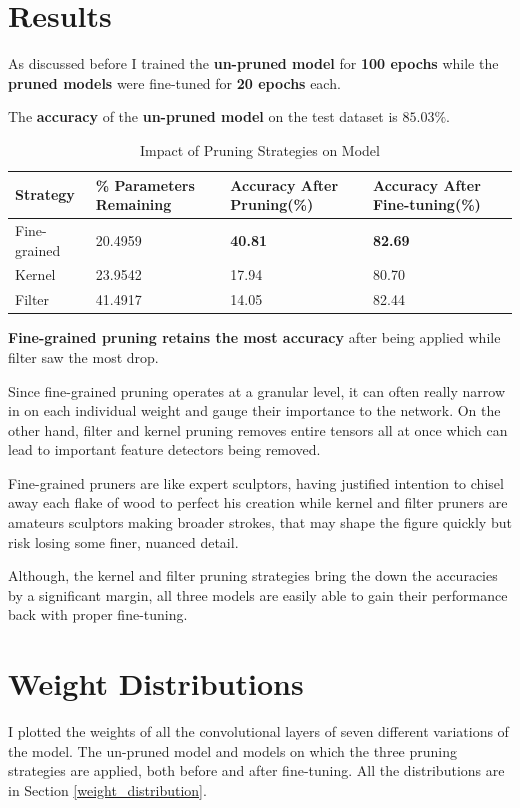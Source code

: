 \documentclass[12pt]{article}
\begin{document}
\section{Results}
As discussed before I trained the \textbf{un-pruned model} for \textbf{100 epochs} while the \textbf{pruned models} were fine-tuned for \textbf{20 epochs} each. 

The \textbf{accuracy} of the \textbf{un-pruned model} on the test dataset is $\boldsymbol{85.03\%}$. 

\begin{table}[h]
\centering
\label{tab:vgg16_pruning_impact}
\begin{tabular}{|p{3.25cm}||p{3.25cm}|p{3.25cm}|p{3.25cm}|}
\hline
\textbf{Strategy} & \textbf{\% Parameters  Remaining} & \textbf{Accuracy After Pruning(\%)} & \textbf{Accuracy After Fine-tuning(\%)} \\
\hline
Fine-grained & 20.4959 & \textbf{40.81} & \textbf{82.69} \\
Kernel & 23.9542 & 17.94 & 80.70 \\
Filter & 41.4917 & 14.05 & 82.44 \\
\hline
\end{tabular}
\caption{Impact of Pruning Strategies on Model}
\end{table}
\noindent
\textbf{Fine-grained pruning retains the most accuracy} after being applied while filter saw the most drop. 

Since fine-grained pruning operates at a granular level, it can often really narrow in on each individual weight and gauge their importance to the network. On the other hand, filter and kernel pruning removes entire tensors all at once which can lead to important feature detectors being removed. 

Fine-grained pruners are like expert sculptors, having justified intention to chisel away each flake of wood to perfect his creation while kernel and filter pruners are amateurs sculptors making broader strokes, that may shape the figure quickly but risk losing some finer, nuanced detail.

Although, the kernel and filter pruning strategies bring the down the accuracies by a significant margin, all three models are easily able to gain their performance back with proper fine-tuning.

\section{Weight Distributions}
I plotted the weights of all the convolutional layers of seven different variations of the model. The un-pruned model and models on which the three pruning strategies are applied, both before and after fine-tuning. All the distributions are in Section \ref{weight_distribution}.
\end{document}
